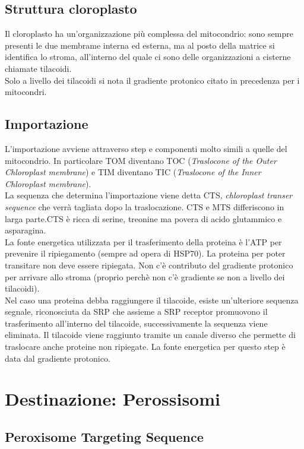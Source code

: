     \subsection{Struttura cloroplasto}
        Il cloroplasto ha un'organizzazione più complessa del mitocondrio: sono sempre presenti le due membrame interna ed esterna, ma al posto della matrice si identifica lo stroma, all'interno del quale ci sono delle organizzazioni a cisterne chiamate tilacoidi.\\
        Solo a livello dei tilacoidi si nota il gradiente protonico citato in precedenza per i mitocondri. 
        
    \subsection{Importazione}
        L'importazione avviene attraverso step e componenti molto simili a quelle del mitocondrio. In particolare TOM diventano TOC (\textit{Traslocone of the Outer Chloroplast membrane}) e TIM diventano TIC (\textit{Traslocone of the Inner Chloroplast membrane}). \\
        La sequenza che determina l'importazione viene detta CTS, \textit{chloroplast transer sequence} che verrà tagliata dopo la traslocazione. CTS e MTS differiscono in larga parte.CTS è ricca di serine, treonine ma povera di acido glutammico e asparagina.\\
        La fonte energetica utilizzata per il trasferimento della proteina è l'ATP per prevenire il ripiegamento (sempre ad opera di HSP70). La proteina per poter transitare non deve essere ripiegata. Non c'è contributo del gradiente protonico per arrivare allo stroma (proprio perchè non c'è gradiente se non a livello dei tilacoidi). \\
        Nel caso una proteina debba raggiungere il tilacoide, esiste un'ulteriore sequenza segnale, riconosciuta da SRP che assieme a SRP receptor promuovono il trasferimento all'interno del tilacoide, successivamente la sequenza viene eliminata.
        Il tilacoide viene raggiunto tramite un canale diverso che permette di traslocare anche proteine non ripiegate. La fonte energetica per questo step è data dal gradiente protonico.

\section{Destinazione: Perossisomi}
    \subsection{Peroxisome Targeting Sequence}
